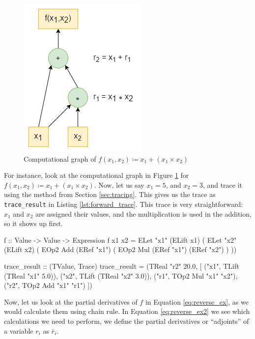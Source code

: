    \begin{figure}[htb]
        \centering
        \includegraphics[scale=0.5]{diagrams/forward_example.png}
        \caption{Computational graph of $f(x_1,x_2)\coloneqq x_1+(x_1\times x_2)$}
        \label{fig:forward_graph}
    \end{figure}
    For instance, look at the computational graph in Figure \ref{fig:forward_graph} for $f(x_1,x_2)\coloneqq x_1+(x_1\times x_2)$.
    Now, let us say $x_1=5$, and $x_2=3$, and trace it using the method from Section \ref{sec:tracing}.
    This gives us the trace as \texttt{trace\_result} in Listing \ref{lst:forward_trace}.
    This trace is very straightforward: $x_1$ and $x_2$ are assigned their values, and the multiplication is used in the addition, so it shows up first.
    \begin{haskell}[caption=DSL definition of $f$ and its trace, label=lst:forward_trace, gobble=8]
        f :: Value -> Value -> Expression
        f x1 x2 = ELet "x1" (ELift x1) (
            ELet "x2" (ELift x2) (
                EOp2 Add (ERef "x1") (
                    EOp2 Mul (ERef "x1") (ERef "x2")
                )
            ))

        trace_result :: (TValue, Trace)
        trace_result = (TReal "r2" 20.0, [
            ("x1", TLift (TReal "x1" 5.0)),
            ("x2", TLift (TReal "x2" 3.0)),
            ("r1", TOp2 Mul "x1" "x2"),
            ("r2", TOp2 Add "x1" "r1")
        ])
    \end{haskell}
    Now, let us look at the partial derivatives of $f$ in Equation \ref{eq:reverse_ex}, as we would calculate them using chain rule.
    In Equation \ref{eq:reverse_ex2} we see which calculations we need to perform, we define the partial derivatives or ``adjoints'' of a variable $r_i$ as $\bar{r}_i$.
